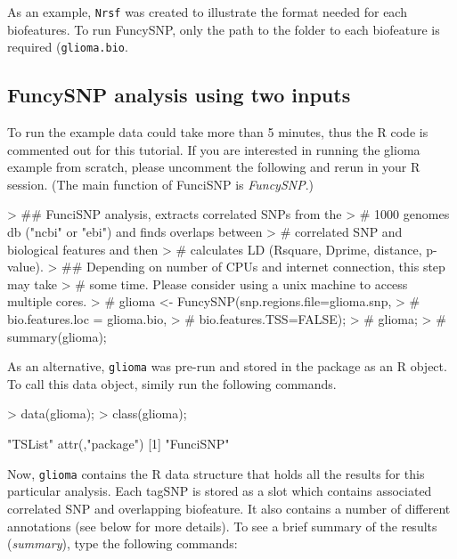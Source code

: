\documentclass[12pt,fullpage]{article}
\newcommand{\Robject}[1]{{\texttt{#1}}}
\newcommand{\Rmethod}[1]{{\textit{#1}}}
\begin{document}
As an example, \Robject{Nrsf} was created to illustrate the format needed for
each biofeatures. To run FuncySNP, only the path to the folder to each
biofeature is required (\Robject{glioma.bio}.

\subsection{FuncySNP analysis using two inputs}

To run the example data could take more than 5 minutes, thus the R code is
commented out for this tutorial. If you are interested in running the glioma
example from scratch, please uncomment the following and rerun in your R
session. (The main function of FunciSNP is \Rmethod{FuncySNP}.)

\begin{Schunk}
\begin{Sinput}
> ## FunciSNP analysis, extracts correlated SNPs from the 
> #  1000 genomes db ("ncbi" or "ebi") and finds overlaps between 
> #  correlated SNP and biological features and then 
> #  calculates LD (Rsquare, Dprime, distance, p-value).
> ## Depending on number of CPUs and internet connection, this step may take 
> # some time. Please consider using a unix machine to access multiple cores.
> # glioma <- FuncySNP(snp.regions.file=glioma.snp, 
> #           bio.features.loc = glioma.bio, 
> #           bio.features.TSS=FALSE);
> # glioma;
> # summary(glioma);
\end{Sinput}
\end{Schunk}

As an alternative, \Robject{glioma} was pre-run and stored in the package as an
R object. To call this data object, simily run the following commands. 

\begin{Schunk}
\begin{Sinput}
> data(glioma);
> class(glioma);
\end{Sinput}
\begin{Soutput}
[1] "TSList"
attr(,"package")
[1] "FunciSNP"
\end{Soutput}
\end{Schunk}

Now, \Robject{glioma} contains the R data structure that holds all the results
for this particular analysis. Each tagSNP is stored as a slot which contains
associated correlated SNP and overlapping biofeature. It also contains a number
of different annotations (see below for more details). To see a brief summary of
the results (\Rmethod{summary}), type the following commands:
\end{document}
